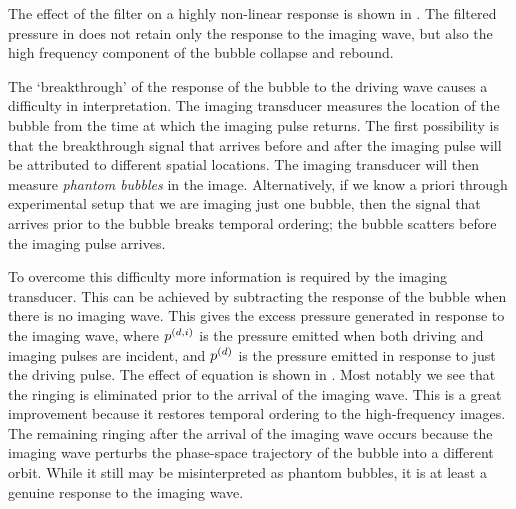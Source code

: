 The effect of the filter on a highly non-linear response is shown in .
The filtered pressure in  does not retain only the response to the imaging wave,
but also the high frequency component of the bubble collapse and rebound.


The `breakthrough' of the response of the bubble to the driving wave
causes a difficulty in interpretation.
The imaging transducer measures the location of the bubble from the 
time at which the imaging pulse returns.
The first possibility is that the breakthrough signal that arrives before 
and after the imaging pulse will be attributed to  different spatial locations.
The imaging transducer will then measure  {\em phantom bubbles} in the image.
Alternatively,
if we know a priori through experimental setup that we are imaging just one bubble,
then the signal that arrives prior to the bubble breaks temporal ordering;
the bubble scatters before the imaging pulse arrives.

To overcome this difficulty more information is required by the imaging transducer.
This can be achieved by subtracting the  response of the bubble when there is no imaging wave.
This gives the excess pressure generated in response to the imaging wave,
where $p^{(d,i)}$ is the pressure emitted when both driving and imaging pulses are incident,
and $p^{(d)}$ is the pressure emitted in response to just the driving pulse.
The effect of equation   is shown in .
Most notably we see that the ringing is eliminated prior to the arrival of the imaging wave.
This is a great improvement because it restores temporal ordering to the high-frequency images.
The remaining ringing after the arrival of the imaging wave occurs  
because the imaging wave perturbs the phase-space trajectory of the bubble into a different orbit.
While it still may be misinterpreted as phantom bubbles, it is at least a genuine response to the imaging wave.

